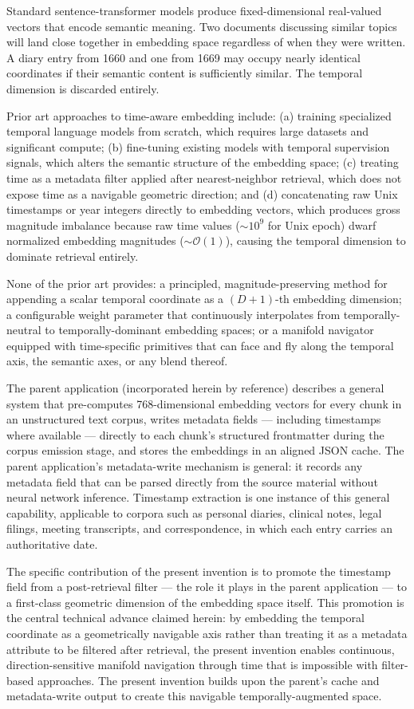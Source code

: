 \documentclass[12pt,letterpaper]{article}
\begin{document}
Standard sentence-transformer models produce fixed-dimensional real-valued
vectors that encode semantic meaning. Two documents discussing similar topics
will land close together in embedding space regardless of when they were
written. A diary entry from 1660 and one from 1669 may occupy nearly identical
coordinates if their semantic content is sufficiently similar. The temporal
dimension is discarded entirely.

Prior art approaches to time-aware embedding include: (a) training specialized
temporal language models from scratch, which requires large datasets and
significant compute; (b) fine-tuning existing models with temporal supervision
signals, which alters the semantic structure of the embedding space; (c)
treating time as a metadata filter applied after nearest-neighbor retrieval,
which does not expose time as a navigable geometric direction; and (d)
concatenating raw Unix timestamps or year integers directly to embedding
vectors, which produces gross magnitude imbalance because raw time values
($\sim 10^9$ for Unix epoch) dwarf normalized embedding magnitudes
($\sim \mathcal{O}(1)$), causing the temporal dimension to dominate retrieval
entirely.

None of the prior art provides: a principled, magnitude-preserving method for
appending a scalar temporal coordinate as a $(D+1)$-th embedding dimension; a
configurable weight parameter that continuously interpolates from
temporally-neutral to temporally-dominant embedding spaces; or a manifold
navigator equipped with time-specific primitives that can face and fly along the
temporal axis, the semantic axes, or any blend thereof.

The parent application (incorporated herein by reference) describes a general
system that pre-computes 768-dimensional embedding vectors for every chunk in an
unstructured text corpus, writes metadata fields --- including timestamps where
available --- directly to each chunk's structured frontmatter during the corpus
emission stage, and stores the embeddings in an aligned JSON cache. The parent
application's metadata-write mechanism is general: it records any metadata field
that can be parsed directly from the source material without neural network
inference. Timestamp extraction is one instance of this general capability,
applicable to corpora such as personal diaries, clinical notes, legal filings,
meeting transcripts, and correspondence, in which each entry carries an
authoritative date.

The specific contribution of the present invention is to promote the timestamp
field from a post-retrieval filter --- the role it plays in the parent application
--- to a first-class geometric dimension of the embedding space itself. This
promotion is the central technical advance claimed herein: by embedding the
temporal coordinate as a geometrically navigable axis rather than treating it
as a metadata attribute to be filtered after retrieval, the present invention
enables continuous, direction-sensitive manifold navigation through time that
is impossible with filter-based approaches. The present invention builds upon
the parent's cache and metadata-write output to create this navigable
temporally-augmented space.
\end{document}
